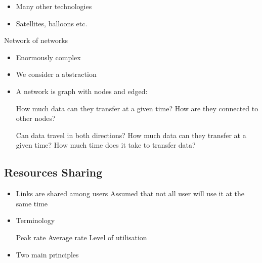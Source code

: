 \begin{itemize}
\begin{itemize}
\begin{itemize}
                    \end{itemize}
                    \begin{itemize}
                        \item Many other technologies
                        \item Satellites, balloons etc.
                    \end{itemize}
        \end{itemize}
     Network of networks
        \begin{itemize}
            \item Enormously complex
            \item We consider a abstraction
            \item A network is graph with nodes and edged:
                \begin{itemize}
                        \begin{itemize}
                             How much data can they transfer at a given time?
                             How are they connected to other nodes?
                        \end{itemize}
                        \begin{itemize}
                             Can data travel in both directions?
                             How much data can they transfer at a given time?
                             How much time does it take to transfer data?
                        \end{itemize}
                \end{itemize}
        \end{itemize}
\end{itemize}

\subsection{Resources Sharing}
\begin{itemize}
    \item Links are shared among users
     Assumed that not all user will use it at the same time 
    \item Terminology
        \begin{itemize}
             Peak rate
             Average rate
             Level of utilisation
        \end{itemize}
    \item Two main principles
\end{itemize}


